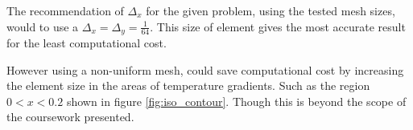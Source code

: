 \documentclass[10pt, a4paper]{article}
\begin{document}
The recommendation of $\Delta_x$ for the given problem, using the tested mesh sizes, would to use a $\Delta_x = \Delta_y = \frac{1}{64}$. This size of element gives the most accurate result for the least computational cost.

However using a non-uniform mesh, could save computational cost by increasing the element size in the areas of temperature gradients. Such as the region $0 < x < 0.2$ shown in figure \ref{fig:iso_contour}. Though this is beyond the scope of the coursework presented.

\newpage
%
\end{document}
